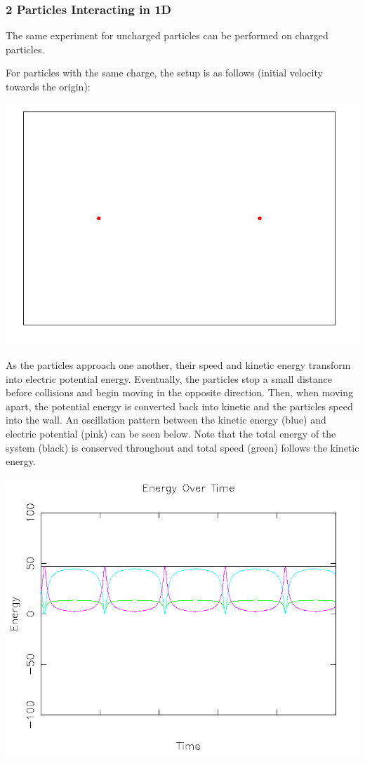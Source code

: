 \documentclass{article}
\begin{document}
\subsubsection{2 Particles Interacting in 1D}
The same experiment for uncharged particles can be performed on charged particles.

For particles with the same charge, the setup is as follows (initial velocity towards the origin):
\\
\begin{center}
    \includegraphics[scale=0.5]{charged_2_same}
\end{center}

As the particles approach one another, their speed and kinetic energy transform into electric potential energy.
Eventually, the particles stop a small distance before collisions and begin moving in the opposite direction.
Then, when moving apart, the potential energy is converted back into kinetic and the particles speed into the wall.
An oscillation pattern between the kinetic energy (blue) and electric potential (pink) can be seen below.
Note that the total energy of the system (black) is conserved throughout and total speed (green) follows the kinetic energy.
\\
\begin{center}
    \includegraphics[scale=0.5]{charged_2_same_energy}
\end{center}
\end{document}
